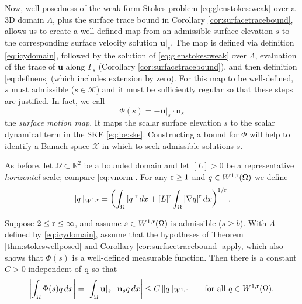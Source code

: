 \documentclass[hidelinks,onefignum,onetabnum,final]{siamart220329}  %
\newcommand{\RR}{\mathbb{R}}
\newcommand{\grad}{\nabla}
\newcommand{\bn}{\mathbf{n}}
\newcommand{\bu}{\mathbf{u}}
\newcommand{\cK}{\mathcal{K}}
\newcommand{\cX}{\mathcal{X}}
\newcommand{\qq}{{\text{\textnormal{q}}}}
\newcommand{\rr}{{\text{\textnormal{r}}}}
\begin{document}
Now, well-posedness of the weak-form Stokes problem \eqref{eq:glenstokes:weak} over a 3D domain $\Lambda$, plus the surface trace bound in Corollary \ref{cor:surfacetracebound}, allows us to create a well-defined map from an admissible surface elevation $s$ to the corresponding surface velocity solution $\bu|_s$.  The map is defined via definition \eqref{eq:icydomain}, followed by the solution of \eqref{eq:glenstokes:weak} over $\Lambda$, evaluation of the trace of $\bu$ along $\Gamma_s$ (Corollary \ref{cor:surfacetracebound}), and then definition \eqref{eq:defineus} (which includes extension by zero).  For this map to be well-defined, $s$ must admissible ($s\in\cK$) and it must be sufficiently regular so that these steps are justified.  In fact, we call
\begin{equation}
\Phi(s) = - \bu|_s\cdot \bn_s \label{eq:definePhi:asfunction}
\end{equation}
the \emph{surface motion map}.  It maps the scalar surface elevation $s$ to the scalar dynamical term in the SKE \eqref{eq:be:ske}.  Constructing a bound for $\Phi$ will help to identify a Banach space $\cX$ in which to seek admissible solutions $s$.

As before, let $\Omega \subset \RR^2$ be a bounded domain and let $[L]>0$ be a representative \emph{horizontal} scale; compare \eqref{eq:vnorm}.  For any $\rr\ge 1$ and $q\in W^{1,\rr}(\Omega)$ we define
\begin{equation}
\|q\|_{W^{1,\rr}} = \left(\int_\Omega |q|^\rr\,dx + [L]^\rr \int_\Omega |\grad q|^\rr\,dx\right)^{1/\rr}. \label{eq:norm:Omega}
\end{equation}

\begin{lemma} \label{lem:phibound:early}  Suppose $2 \le \rr \le \infty$, and assume $s\in W^{1,\rr}(\Omega)$ is admissible ($s\ge b$).  With $\Lambda$ defined by \eqref{eq:icydomain}, assume that the hypotheses of Theorem \ref{thm:stokeswellposed} and Corollary \ref{cor:surfacetracebound} apply, which also shows that $\Phi(s)$ is a well-defined measurable function.  Then there is a constant $C>0$ independent of $\qq$ so that
\begin{equation}
\left|\int_\Omega \Phi(s) q\,dx\right| = \left|\int_\Omega \bu|_s\cdot \bn_s q\,dx\right| \le C\, \|q\|_{W^{1,\rr}} \qquad \text{for all } q\in W^{1,\rr}(\Omega).  \label{eq:phibound:early}
\end{equation}
\end{lemma}
\end{document}
